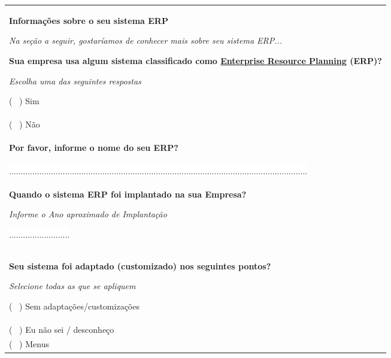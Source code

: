 \noindent  \begin{longtable}{|p{15.7cm}|}
	\hline
	\tabitem 	\begin{Spacing}{1.1} 
		\textbf{Informações sobre o seu sistema ERP} \end{Spacing} 
		\tiny \textit{Na seção a seguir, gostaríamos de conhecer mais sobre seu sistema ERP...} 
    \hline
	\begin{Spacing}{1.0} 
		\textbf{Sua empresa  usa algum sistema classificado como {\color{blue} \underline{Enterprise Resource Planning} } (ERP)?  } \end{Spacing} 
	\begin{Spacing}{2.0} 
		\tiny \textit{Escolha uma das seguintes respostas} \end{Spacing} 
	( \ ) Sim\\
	( \ ) Não\\
	\begin{Spacing}{0.8} \end{Spacing}
	\textbf{Por favor, informe o nome do seu ERP?} \\
	\colorbox{white}{ ................................................................................................................................ }\\
	\begin{Spacing}{0.8} \end{Spacing}
	\begin{Spacing}{0.8} 
		\textbf{Quando o sistema ERP foi implantado na sua Empresa?} \end{Spacing} 
	\begin{Spacing}{2.0} 
		\tiny \textit{Informe o Ano aproximado de Implantação} \end{Spacing} 
	\colorbox{white}{ .......................... }\\
	\begin{Spacing}{0.8} \end{Spacing}
	\begin{Spacing}{0.8} 
		\textbf{Seu sistema foi adaptado (customizado) nos seguintes pontos?} \end{Spacing} 
	\begin{Spacing}{2.0} 
		\tiny \textit{Selecione todas as que se apliquem} \end{Spacing} 
	( \ ) Sem adaptações/customizações\\
	( \ ) Eu não sei / desconheço\\
	( \ ) Menus\\

\end{longtable}
